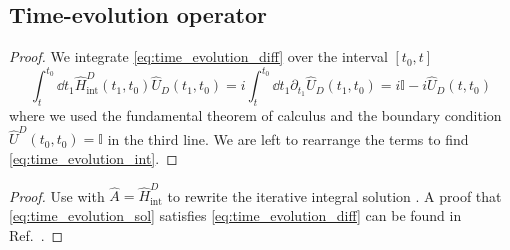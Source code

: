 \subsection{Time-evolution operator}

\begin{proof}
	We integrate \cref{eq:time_evolution_diff} over the interval $[t_0,t]$
	\begin{equation*}
		\int_t^{t_0}\dd{t_1}
		\hat{H}_\text{int}^D(t_1,t_0)
		\hat{U}_D(t_1,t_0)
		=
		i\int_t^{t_0}\dd{t_1}
		\partial_{t_1}
		\hat{U}_D(t_1,t_0)
		=
		i\mathbb{I}
		-
		i\hat{U}_D(t,t_0)
	\end{equation*}
	where we used the fundamental theorem of calculus and the boundary condition $\hat{U}^D(t_0,t_0)=\mathbb{I}$ in the third line.
	We are left to rearrange the terms to find \cref{eq:time_evolution_int}.
\end{proof}
\begin{proof}
	Use  with $\hat{A}=\hat{H}_\text{int}^D$ to rewrite the iterative integral solution .
	A proof that \cref{eq:time_evolution_sol} satisfies \cref{eq:time_evolution_diff} can be found in Ref.~\cite[p.~219]{Greiner2013}.
\end{proof}

